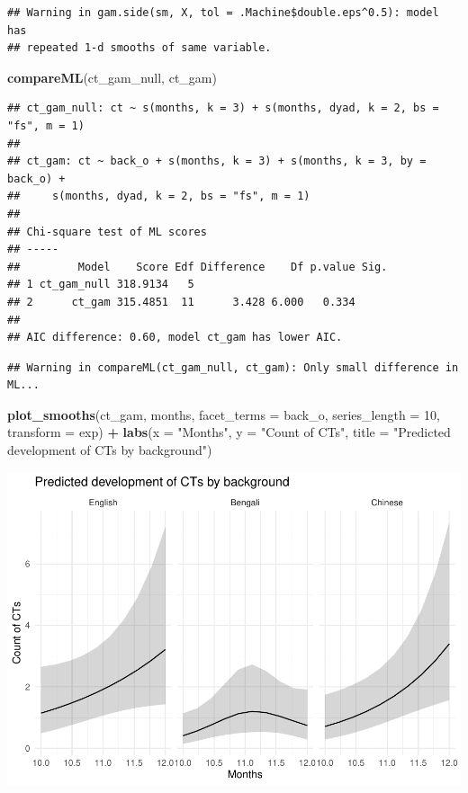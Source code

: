 \documentclass[]{article}
\newenvironment{Shaded}{\begin{snugshade}}{\end{snugshade}}
\newcommand{\DataTypeTok}[1]{\textcolor[rgb]{0.13,0.29,0.53}{#1}}
\newcommand{\DecValTok}[1]{\textcolor[rgb]{0.00,0.00,0.81}{#1}}
\newcommand{\KeywordTok}[1]{\textcolor[rgb]{0.13,0.29,0.53}{\textbf{#1}}}
\newcommand{\NormalTok}[1]{#1}
\newcommand{\OperatorTok}[1]{\textcolor[rgb]{0.81,0.36,0.00}{\textbf{#1}}}
\newcommand{\StringTok}[1]{\textcolor[rgb]{0.31,0.60,0.02}{#1}}
\begin{document}
\begin{verbatim}
## Warning in gam.side(sm, X, tol = .Machine$double.eps^0.5): model has
## repeated 1-d smooths of same variable.
\end{verbatim}

\begin{Shaded}
\begin{Highlighting}[]
\KeywordTok{compareML}\NormalTok{(ct_gam_null, ct_gam)}
\end{Highlighting}
\end{Shaded}

\begin{verbatim}
## ct_gam_null: ct ~ s(months, k = 3) + s(months, dyad, k = 2, bs = "fs", m = 1)
## 
## ct_gam: ct ~ back_o + s(months, k = 3) + s(months, k = 3, by = back_o) + 
##     s(months, dyad, k = 2, bs = "fs", m = 1)
## 
## Chi-square test of ML scores
## -----
##         Model    Score Edf Difference    Df p.value Sig.
## 1 ct_gam_null 318.9134   5                              
## 2      ct_gam 315.4851  11      3.428 6.000   0.334     
## 
## AIC difference: 0.60, model ct_gam has lower AIC.
\end{verbatim}

\begin{verbatim}
## Warning in compareML(ct_gam_null, ct_gam): Only small difference in ML...
\end{verbatim}

\begin{Shaded}
\begin{Highlighting}[]
\KeywordTok{plot_smooths}\NormalTok{(ct_gam, months, }\DataTypeTok{facet_terms =}\NormalTok{ back_o, }\DataTypeTok{series_length =} \DecValTok{10}\NormalTok{, }\DataTypeTok{transform =}\NormalTok{ exp) }\OperatorTok{+}
\StringTok{  }\KeywordTok{labs}\NormalTok{(}\DataTypeTok{x =} \StringTok{"Months"}\NormalTok{, }\DataTypeTok{y =} \StringTok{"Count of CTs"}\NormalTok{, }\DataTypeTok{title =} \StringTok{"Predicted development of CTs by background"}\NormalTok{)}
\end{Highlighting}
\end{Shaded}

\includegraphics{supplement_files/figure-latex/ct-gam-plot-1.pdf}
\end{document}

